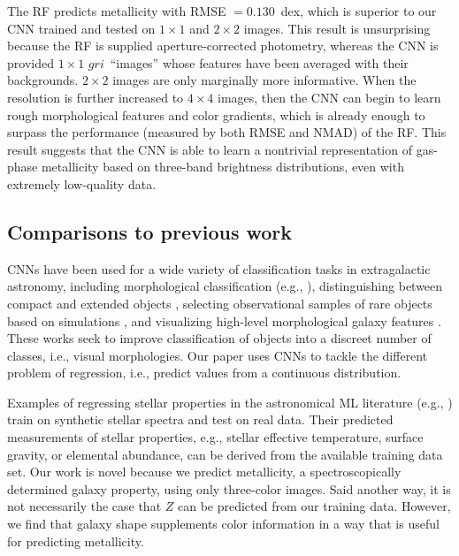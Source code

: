 \documentclass[fleqn,usenatbib]{mnras}
\newcommand{\sdssg}{\hbox{$g$}}
\newcommand{\sdssr}{\hbox{$r$}}
\newcommand{\sdssi}{\hbox{$i$}}
\newcommand{\eg}{e.g.}
\newcommand{\ie}{i.e.}
\newcommand{\citeeg}[1]{(\eg, \citealt{#1})}
\begin{document}
The RF predicts metallicity with RMSE $= 0.130$~dex, which is superior to our CNN trained and tested on $1\times 1$ and $2 \times 2$ images. This result is unsurprising because the RF is supplied aperture-corrected photometry, whereas the CNN is provided $1 \times 1 $ \sdssg\sdssr\sdssi\ ``images'' whose features have been averaged with their backgrounds. $2 \times 2$ images are only marginally more informative. When the resolution is further increased to $4 \times 4$ images, then the CNN can begin to learn rough morphological features and color gradients, which is already enough to surpass the performance (measured by both RMSE and NMAD) of the RF.
This result suggests that the CNN is able to learn a nontrivial representation of gas-phase metallicity based on three-band brightness distributions, even with extremely low-quality data.

\subsection{Comparisons to previous work}\label{sec:previous work}
CNNs have been used for a wide variety of classification tasks in extragalactic astronomy, including morphological classification \citeeg{Dieleman2015, Huertas-Company2015, 2017MNRAS.464.4420S}, distinguishing between compact and extended objects \citep{Kim2017}, selecting observational samples of rare objects based on simulations \citep{Huertas-Company2018, Lanusse2017}, and visualizing high-level morphological galaxy features \citep{Dai2018}. These works seek to improve classification of objects into a discreet number of classes, \ie, visual morphologies. Our paper uses CNNs to tackle the different problem of regression, \ie, predict values from a continuous distribution.

Examples of regressing stellar properties in the astronomical ML literature \citeeg{2000A&A...357..197B, Fabbro2018} train on synthetic stellar spectra and test on real data. Their predicted measurements of stellar properties, \eg, stellar effective temperature, surface gravity, or elemental abundance, can be derived from the available training data set. Our work is novel because we predict metallicity, a spectroscopically determined galaxy property, using only three-color images. Said another way, it is not necessarily the case that $Z$ can be predicted from our training data. However, we find that galaxy shape supplements color information in a way that is useful for predicting metallicity.
\end{document}
